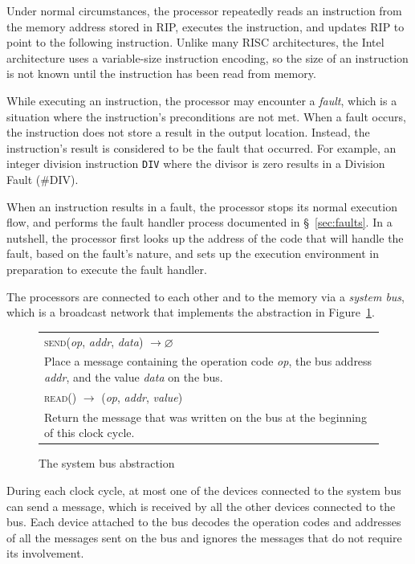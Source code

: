 Under normal circumstances, the processor repeatedly reads an instruction from
the memory address stored in RIP, executes the instruction, and updates RIP to
point to the following instruction. Unlike many RISC architectures, the Intel
architecture uses a variable-size instruction encoding, so the size of an
instruction is not known until the instruction has been read from memory.

While executing an instruction, the processor may encounter a \textit{fault},
which is a situation where the instruction's preconditions are not met. When
a fault occurs, the instruction does not store a result in the output location.
Instead, the instruction's result is considered to be the fault that occurred.
For example, an integer division instruction \texttt{DIV} where the divisor is
zero results in a Division Fault (\#DIV).

When an instruction results in a fault, the processor stops its normal
execution flow, and performs the fault handler process documented in
\S~\ref{sec:faults}. In a nutshell, the processor first looks up the address of
the code that will handle the fault, based on the fault's nature, and sets up
the execution environment in preparation to execute the fault handler.

The processors are connected to each other and to the memory via a
\textit{system bus}, which is a broadcast network that implements the
abstraction in Figure~\ref{fig:bus_abstraction}.

\begin{figure}[hbt]
  \centering
  \begin{tabularx}{\columnwidth}{| X |}
  \hline
  \textsc{send}(\textit{op}, \textit{addr}, \textit{data})
  $ \rightarrow \varnothing $ \\
  Place a message containing the operation code \textit{op}, the bus address
  \textit{addr}, and the value \textit{data} on the bus. \\
  \hline
  \textsc{read}() $ \rightarrow $ (\textit{op}, \textit{addr},
  \textit{value}) \\
  Return the message that was written on the bus at the beginning of this
  clock cycle. \\
  \hline
  \end{tabularx}
  \caption{The system bus abstraction}
  \label{fig:bus_abstraction}
\end{figure}

During each clock cycle, at most one of the devices connected to the system bus
can send a message, which is received by all the other devices connected to the
bus. Each device attached to the bus decodes the operation codes and addresses
of all the messages sent on the bus and ignores the messages that do not
require its involvement.

